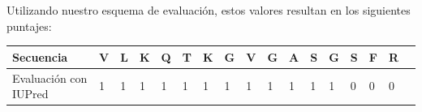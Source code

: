 Utilizando nuestro esquema de evaluación, estos valores resultan en los siguientes puntajes:

\vspace{0.5cm}
\begin{tabular}{lllllllllllllllll} 
\hline
Secuencia & \textbf{V} & \textbf{L} & \textbf{K} & \textbf{Q} & \textbf{T} & \textbf{K} & \textbf{G} & \textbf{V} & \textbf{G} & \textbf{A} & \textbf{S} & \textbf{G} & \textbf{S} & \textbf{F} & \textbf{R} \\ \hline
Evaluación con IUPred & 1 & 1 & 1 & 1 & 1 & 1 & 1 & 1 & 1 & 1 & 1 & 1 & 0 & 0 & 0\\ \hline
\end{tabular}







